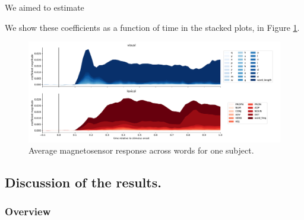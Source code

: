 We aimed to estimate

We show these coefficients as a function of time in the stacked plots, in Figure
\ref{fig:megresult}.

\begin{figure} \centering \includegraphics[width=\textwidth, trim=1.5cm 1cm
0.5cm 0cm, clip=True]{meg_result.pdf} \caption{Average magnetosensor response
across words for one subject.} \label{fig:megresult} \end{figure}



\subsection{Discussion of the results.}

\subsubsection{Overview}

